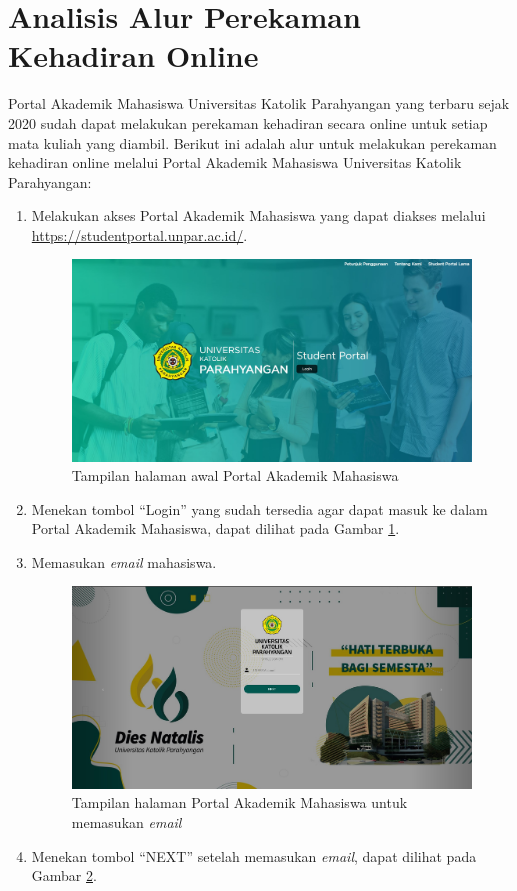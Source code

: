 \section{Analisis Alur Perekaman Kehadiran Online}
\label{sec:alur} 
Portal Akademik Mahasiswa Universitas Katolik Parahyangan yang terbaru sejak 2020 sudah dapat melakukan perekaman kehadiran secara online untuk setiap mata kuliah yang diambil. Berikut ini adalah alur untuk melakukan perekaman kehadiran online melalui Portal Akademik Mahasiswa Universitas Katolik Parahyangan:
\begin{enumerate}
	\item Melakukan akses Portal Akademik Mahasiswa yang dapat diakses melalui \url{https://studentportal.unpar.ac.id/}.
	\begin{figure}[H]
		\centering
		\includegraphics[scale=0.225]{Gambar/halaman2019.jpg}
		\caption{Tampilan halaman awal Portal Akademik Mahasiswa} 
		\label{fig:studpor_home_2019}
	\end{figure}
	\item Menekan tombol ``Login'' yang sudah tersedia agar dapat masuk ke dalam Portal Akademik Mahasiswa, dapat dilihat pada Gambar \ref{fig:studpor_home_2019}.
	
	\item Memasukan \textit{email} mahasiswa.
	\begin{figure}[H]
		\centering
		\includegraphics[scale=0.225]{Gambar/login.jpg}
		\caption{Tampilan halaman Portal Akademik Mahasiswa untuk memasukan \textit{email}} 
		\label{fig:login}
	\end{figure}
	\item Menekan tombol ``NEXT'' setelah memasukan \textit{email}, dapat dilihat pada Gambar \ref{fig:login}.
	

\end{enumerate}
